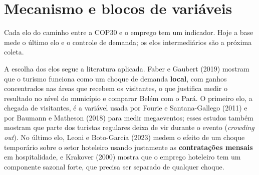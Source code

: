 
\section{Mecanismo e blocos de variáveis}

Cada elo do caminho entre a COP30 e o emprego tem um indicador. Hoje a base mede o último elo e o
controle de demanda; os elos intermediários são a próxima coleta.

A escolha dos elos segue a literatura aplicada. Faber e Gaubert (2019) mostram que o turismo funciona
como um choque de demanda \textbf{local}, com ganhos concentrados nas áreas que recebem os visitantes, o
que justifica medir o resultado no nível do município e comparar Belém com o Pará. O primeiro elo, a
chegada de visitantes, é a variável usada por Fourie e Santana-Gallego (2011) e por Baumann e Matheson
(2018) para medir megaeventos; esses estudos também mostram que parte dos turistas regulares deixa de
vir durante o evento (\textit{crowding out}). No último elo, Leoni e Boto-García (2023) medem o efeito de
um choque temporário sobre o setor hoteleiro usando justamente as \textbf{contratações mensais} em
hospitalidade, e Krakover (2000) mostra que o emprego hoteleiro tem um componente sazonal forte, que
precisa ser separado de qualquer choque.

